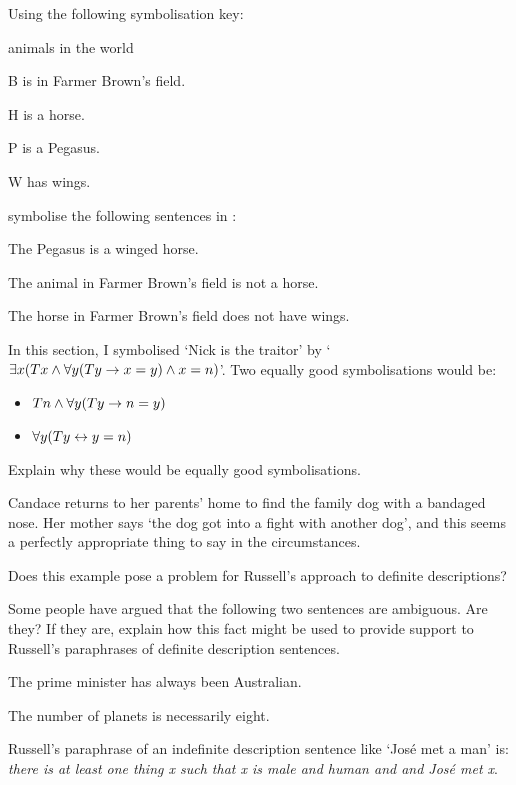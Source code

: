 \problempart Using the following symbolisation key:
\begin{ekey}
\item[\text{domain}] animals in the world
\item[B]  is in Farmer Brown's field.
\item[H]  is a horse.
\item[P]  is a Pegasus.
\item[W]  has wings.
\end{ekey}
symbolise the following sentences in \FOL:
\begin{earg}
\item The Pegasus is a winged horse.
\item The animal in Farmer Brown's field is not a horse.
\item The horse in Farmer Brown's field does not have wings.
\end{earg}

\problempart
In this section, I symbolised `Nick is the traitor' by `$\exists x (Tx \wedge \forall y(Ty \rightarrow x = y) \wedge x = n)$'. Two equally good symbolisations would be:
	\begin{itemize}
		\item $Tn \wedge \forall y(Ty \rightarrow n = y)$
		\item $\forall y(Ty \leftrightarrow y = n)$
	\end{itemize}
Explain why these would be equally good symbolisations.

\problempart
Candace returns to her parents' home to find the family dog with a bandaged nose. Her mother says `the dog got into a fight with another dog', and this seems a perfectly appropriate thing to say in the circumstances. 

Does this example pose a problem for Russell's approach to definite descriptions?




\problempart
Some people have argued that the following two sentences are ambiguous. Are they? If they are, explain how this fact might be used to provide support to Russell's paraphrases of definite description sentences. \begin{earg}
	\item The prime minister has always been Australian.
	\item The number of planets is necessarily eight.
\end{earg}

\problempart
Russell's paraphrase of an indefinite description \label{indefs} sentence like `José met a man' is: \emph{there is at least one thing x such that x is male and human and and José met x}. 

